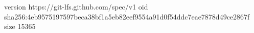 version https://git-lfs.github.com/spec/v1
oid sha256:4eb9575197597beca38bf1a5eb82eef9554a91d0f54ddc7eae7878d49ce2867f
size 15365

